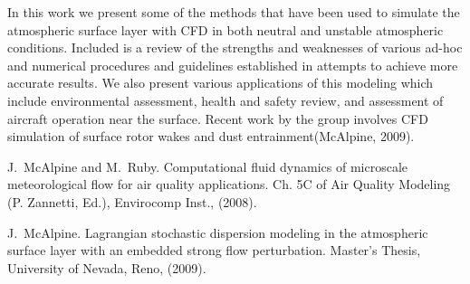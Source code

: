 In this work we present some of the methods that have been used to simulate the atmospheric surface layer with CFD in both neutral and unstable atmospheric conditions. Included is a review of the strengths and weaknesses of various ad-hoc and numerical procedures and guidelines established in attempts to achieve more accurate results. We also present various applications of this modeling which include environmental assessment, health and safety review, and assessment of aircraft 
operation near the surface. Recent work by the group involves CFD simulation of surface rotor wakes and dust entrainment(McAlpine, 2009).


\begin{thebibliography}{10}
{\sc J.~McAlpine and M.~Ruby}. {Computational fluid dynamics of microscale meteorological flow for air quality applications}. Ch. 5C of Air Quality Modeling (P. Zannetti, Ed.), Envirocomp Inst., (2008).

{\sc J.~McAlpine}. {Lagrangian stochastic dispersion modeling in the atmospheric surface layer with an embedded strong flow perturbation}. Master's Thesis,  University of Nevada, Reno, (2009).
\end{thebibliography}
